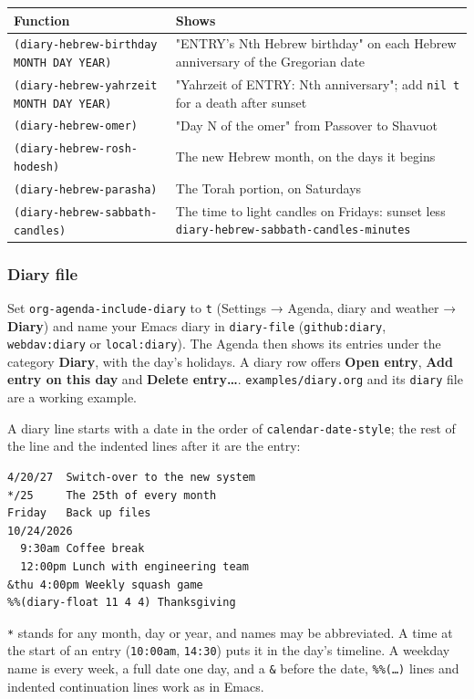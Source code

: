 \documentclass[11pt]{article}
\begin{document}
\begin{center}
\begin{tabular}{ll}
Function & Shows\\[0pt]
\hline
\texttt{(diary-hebrew-birthday MONTH DAY YEAR)} & "ENTRY's Nth Hebrew birthday" on each Hebrew anniversary of the Gregorian date\\[0pt]
\texttt{(diary-hebrew-yahrzeit MONTH DAY YEAR)} & "Yahrzeit of ENTRY: Nth anniversary"; add \texttt{nil t} for a death after sunset\\[0pt]
\texttt{(diary-hebrew-omer)} & "Day N of the omer" from Passover to Shavuot\\[0pt]
\texttt{(diary-hebrew-rosh-hodesh)} & The new Hebrew month, on the days it begins\\[0pt]
\texttt{(diary-hebrew-parasha)} & The Torah portion, on Saturdays\\[0pt]
\texttt{(diary-hebrew-sabbath-candles)} & The time to light candles on Fridays: sunset less \texttt{diary-hebrew-sabbath-candles-minutes}\\[0pt]
\end{tabular}
\end{center}

\subsubsection{Diary file}
\label{sec:orgc7359b6}
Set \texttt{org-agenda-include-diary} to \texttt{t} (Settings → Agenda, diary and weather → \textbf{Diary}) and name your Emacs diary in \texttt{diary-file} (\texttt{github:diary}, \texttt{webdav:diary} or \texttt{local:diary}). The Agenda then shows its entries under the category \textbf{Diary}, with the day's holidays. A diary row offers \textbf{Open entry}, \textbf{Add entry on this day} and \textbf{Delete entry…}. \texttt{examples/diary.org} and its \texttt{diary} file are a working example.

A diary line starts with a date in the order of \texttt{calendar-date-style}; the rest of the line and the indented lines after it are the entry:

\begin{verbatim}
4/20/27  Switch-over to the new system
*/25     The 25th of every month
Friday   Back up files
10/24/2026
  9:30am Coffee break
  12:00pm Lunch with engineering team
&thu 4:00pm Weekly squash game
%%(diary-float 11 4 4) Thanksgiving
\end{verbatim}

\texttt{*} stands for any month, day or year, and names may be abbreviated. A time at the start of an entry (\texttt{10:00am}, \texttt{14:30}) puts it in the day's timeline. A weekday name is every week, a full date one day, and a \texttt{\&} before the date, \texttt{\%\%(…)} lines and indented continuation lines work as in Emacs.
\end{document}

